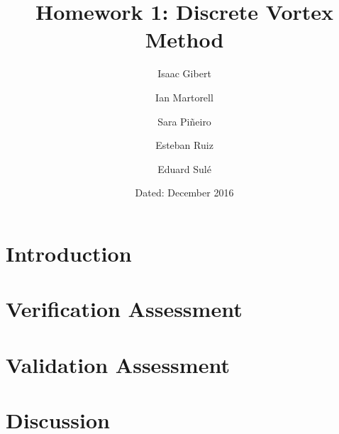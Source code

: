 \documentclass[11pt, a4paper]{article}
\begin{document}
\author{Isaac Gibert}
\author{Ian Martorell}
\author{Sara Piñeiro}
\author{Esteban Ruiz}
\author{Eduard Sulé}
\title{Homework 1: Discrete Vortex Method}
\date{Dated: December 2016}
\maketitle

\section{Introduction}

\section{Verification Assessment}

\section{Validation Assessment}

\section{Discussion}
\end{document}
